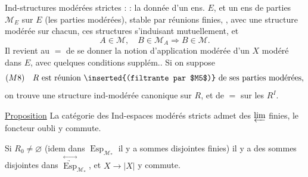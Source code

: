 Ind-structures modérées strictes   :  : la donnée d'un ens. $E$, et un ens de parties $\mathcal M_E$ sur $E$ (les parties modérées), stable par réunions finies, , avec une structure modérée sur chacun, ces structures s'induisant mutuellement, et
\[
 A\in\mathcal M,\quad B\in\mathcal M_A\Longrightarrow B\in\mathcal M.
\]
Il revient au $=$ de se donner la notion d'application modérée d'un $X$ modéré dans $E$, avec  quelques conditions supplém.. Si on suppose
\[
 (M8)\quad R\text{ est réunion \inserted{(filtrante par $M5$)} de ses parties modérées},
\]
on trouve une structure ind-modérée canonique sur $R$, et de $=$ sur les $R^I$.

\uline{Proposition} La catégorie des   Ind-espaces modérés stricts admet des $\varprojlim$ finies, le foncteur oubli y commute.

Si $R_0\ne\varnothing$ (idem dans $\operatorname{Esp}_{\mathcal M_*}$ il y a sommes disjointes finies) il y a des sommes disjointes   dans $\overset{\leftrightarrow}{\underrightarrow{\operatorname{Esp}}}_{\mathcal M_*}$, et $X\longrightarrow |X|$ y commute.
